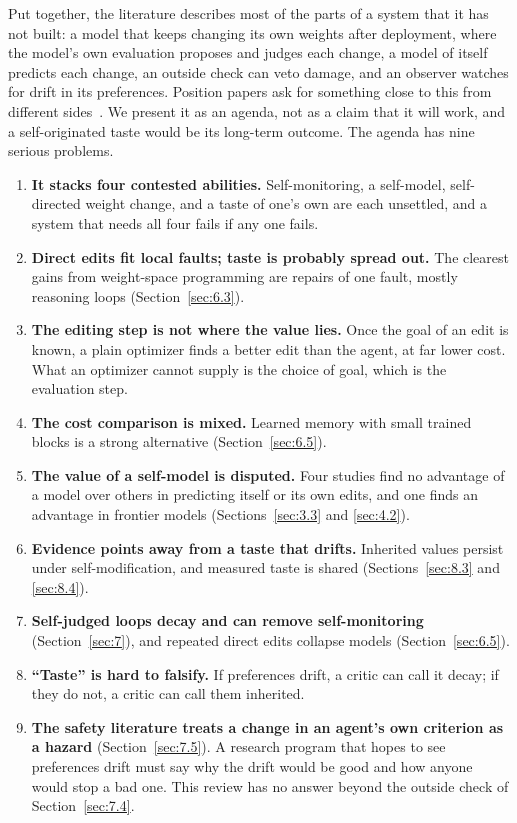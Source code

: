 \documentclass[journal]{IEEEtran}
\begin{document}
Put together, the literature describes most of the parts of a system that it has not built: a model that keeps changing its own weights after deployment, where the model's own evaluation proposes and judges each change, a model of itself predicts each change, an outside check can veto damage, and an observer watches for drift in its preferences. Position papers ask for something close to this from different sides~\cite{Liu2025,Johnson2025}. We present it as an agenda, not as a claim that it will work, and a self-originated taste would be its long-term outcome. The agenda has nine serious problems.
\begin{enumerate}
\item \textbf{It stacks four contested abilities.} Self-monitoring, a self-model, self-directed weight change, and a taste of one's own are each unsettled, and a system that needs all four fails if any one fails.
\item \textbf{Direct edits fit local faults; taste is probably spread out.} The clearest gains from weight-space programming are repairs of one fault, mostly reasoning loops (Section~\ref{sec:6.3}).
\item \textbf{The editing step is not where the value lies.} Once the goal of an edit is known, a plain optimizer finds a better edit than the agent, at far lower cost. What an optimizer cannot supply is the choice of goal, which is the evaluation step.
\item \textbf{The cost comparison is mixed.} Learned memory with small trained blocks is a strong alternative (Section~\ref{sec:6.5}).
\item \textbf{The value of a self-model is disputed.} Four studies find no advantage of a model over others in predicting itself or its own edits, and one finds an advantage in frontier models (Sections~\ref{sec:3.3} and \ref{sec:4.2}).
\item \textbf{Evidence points away from a taste that drifts.} Inherited values persist under self-modification, and measured taste is shared (Sections~\ref{sec:8.3} and \ref{sec:8.4}).
\item \textbf{Self-judged loops decay and can remove self-monitoring} (Section~\ref{sec:7}), and repeated direct edits collapse models (Section~\ref{sec:6.5}).
\item \textbf{``Taste'' is hard to falsify.} If preferences drift, a critic can call it decay; if they do not, a critic can call them inherited.
\item \textbf{The safety literature treats a change in an agent's own criterion as a hazard} (Section~\ref{sec:7.5}). A research program that hopes to see preferences drift must say why the drift would be good and how anyone would stop a bad one. This review has no answer beyond the outside check of Section~\ref{sec:7.4}.
\end{enumerate}
\end{document}

